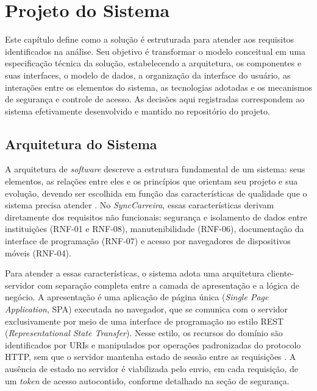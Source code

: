 \chapter{Projeto do Sistema}\label{cap:projeto}

Este capítulo define como a solução é estruturada para atender aos requisitos identificados na análise. Seu objetivo é transformar o modelo conceitual em uma especificação técnica da solução, estabelecendo a arquitetura, os componentes e suas interfaces, o modelo de dados, a organização da interface do usuário, as interações entre os elementos do sistema, as tecnologias adotadas e os mecanismos de segurança e controle de acesso. As decisões aqui registradas correspondem ao sistema efetivamente desenvolvido e mantido no repositório do projeto.

\section{Arquitetura do Sistema}

A arquitetura de \textit{software} descreve a estrutura fundamental de um sistema: seus elementos, as relações entre eles e os princípios que orientam seu projeto e sua evolução, devendo ser escolhida em função das características de qualidade que o sistema precisa atender \cite{richards2020}. No \textit{SyncCarreira}, essas características derivam diretamente dos requisitos não funcionais: segurança e isolamento de dados entre instituições (RNF-01 e RNF-08), manutenibilidade (RNF-06), documentação da interface de programação (RNF-07) e acesso por navegadores de dispositivos móveis (RNF-04).

Para atender a essas características, o sistema adota uma arquitetura cliente-servidor com separação completa entre a camada de apresentação e a lógica de negócio. A apresentação é uma aplicação de página única (\textit{Single Page Application}, SPA) executada no navegador, que se comunica com o servidor exclusivamente por meio de uma interface de programação no estilo REST (\textit{Representational State Transfer}). Nesse estilo, os recursos do domínio são identificados por URIs e manipulados por operações padronizadas do protocolo HTTP, sem que o servidor mantenha estado de sessão entre as requisições \cite{fielding2000}. A ausência de estado no servidor é viabilizada pelo envio, em cada requisição, de um \textit{token} de acesso autocontido, conforme detalhado na seção de segurança.

